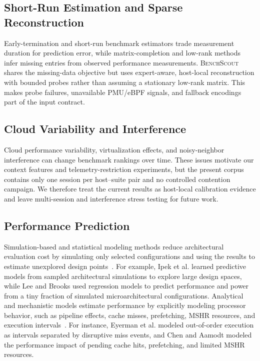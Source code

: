 \documentclass[sigplan,10pt]{acmart}
\newcommand{\ourmethod}{\textsc{BenchScout}\xspace}
\begin{document}
\subsection{Short-Run Estimation and Sparse Reconstruction}
Early-termination and short-run benchmark estimators trade measurement duration for prediction error, while matrix-completion and low-rank methods infer missing entries from observed performance measurements.  \ourmethod{} shares the missing-data objective but uses expert-aware, host-local reconstruction with bounded probes rather than assuming a stationary low-rank matrix.  This makes probe failures, unavailable PMU/eBPF signals, and fallback encodings part of the input contract.

\subsection{Cloud Variability and Interference}
Cloud performance variability, virtualization effects, and noisy-neighbor interference can change benchmark rankings over time.  These issues motivate our context features and telemetry-restriction experiments, but the present corpus contains only one session per host--suite pair and no controlled contention campaign.  We therefore treat the current results as host-local calibration evidence and leave multi-session and interference stress testing for future work.

\subsection{Performance Prediction}
\label{subsec:rw-performance-prediction}

Simulation-based and statistical modeling methods reduce architectural evaluation cost by simulating only selected configurations and using the results to estimate unexplored design points~\cite{ipek2005approach,ipek2006efficiently,lee2006accurate,sharkawi2009performance}.
For example, Ipek et al.\cite{ipek2006efficiently} learned predictive models from sampled architectural simulations to explore large design spaces, while Lee and Brooks\cite{lee2006accurate} used regression models to predict performance and power from a tiny fraction of simulated microarchitectural configurations.
Analytical and mechanistic models estimate performance by explicitly modeling processor behavior, such as pipeline effects, cache misses, prefetching, MSHR resources, and execution intervals~\cite{hartstein2002optimum,eyerman2009mechanistic,chen2011hybrid,eyerman2011mechanistic,van2015micro}.
For instance, Eyerman et al.\cite{eyerman2009mechanistic} modeled out-of-order execution as intervals separated by disruptive miss events, and Chen and Aamodt\cite{chen2011hybrid} modeled the performance impact of pending cache hits, prefetching, and limited MSHR resources. 
\end{document}

